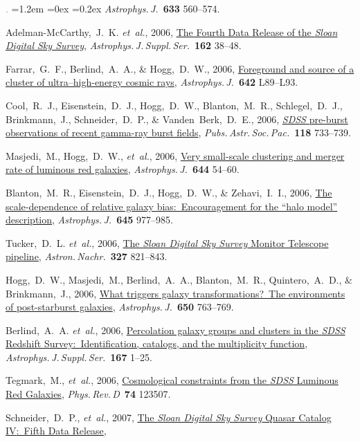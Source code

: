 \documentclass[10pt,letterpaper]{article}
\newcommand{\acronym}[1]{{\small{#1}}}
\newcommand{\foreign}[1]{\textsl{#1}}
\newcommand{\etal}{\foreign{et~al.}}
\newcommand{\project}[1]{\textsl{#1}}
\newcommand{\doi}[2]{\href{http://dx.doi.org/#1}{{#2}}}
\newcommand{\deemph}[1]{\textcolor{grey}{\footnotesize{#1}}}
\newcommand{\pubnumber}[1]{\deemph{{#1}.}}
\newcounter{refpubnum}
\newcommand{\hogglist}{%
    \rightmargin=0in
    \leftmargin=1.2em
    \topsep=0ex
    \partopsep=0pt
    \itemsep=0.2ex
    \parsep=0pt
    \itemindent=-1.0\leftmargin
    \listparindent=0.0\leftmargin
    \settowidth{\labelsep}{~}
    \usecounter{refpubnum}
  }
\begin{document}
\begin{list}{\pubnumber{\therefpubnum}}{\hogglist}
\textit{Astrophys.\,J.}\ \textbf{633} 560--574.
\item
Adelman-McCarthy,~J.~K. \etal, 2006,
\doi{10.1086/497917}{The Fourth Data Release of the \project{Sloan Digital Sky Survey}},
\textit{Astrophys.\,J.\,Suppl.\,Ser.}\ \textbf{162} 38--48.
\item
Farrar,~G.~F., Berlind,~A.~A., \& Hogg,~D.~W., 2006,
\doi{10.1086/504711}{Foreground and source of a cluster of ultra--high-energy cosmic rays},
\textit{Astrophys.\,J.}\ \textbf{642} L89--L93.
\item
Cool,~R.~J., Eisenstein,~D.~J., Hogg,~D.~W., Blanton,~M.~R., Schlegel,~D.~J., Brinkmann,~J., Schneider,~D.~P., \& Vanden~Berk,~D.~E., 2006,
\doi{10.1086/503334}{\project{\acronym{SDSS}} pre-burst observations of recent gamma-ray burst fields},
\textit{Pubs.\,Astr.\,Soc.\,Pac.}\ \textbf{118} 733--739.
\item\label{pub:Masjedi2006}
Masjedi,~M., Hogg,~D.~W., \etal, 2006,
\doi{10.1086/503536}{Very small-scale clustering and merger rate of luminous red galaxies},
\textit{Astrophys.\,J.}\ \textbf{644} 54--60.
\item
Blanton,~M.~R., Eisenstein,~D.~J., Hogg,~D.~W., \& Zehavi,~I.~I., 2006,
\doi{10.1086/500918}{The scale-dependence of relative galaxy bias:\ Encouragement for the ``halo model'' description},
\textit{Astrophys.\,J.}\ \textbf{645}
977--985.
\item
Tucker,~D.~L. \etal, 2006,
\doi{10.1002/asna.200610655}{The \project{Sloan Digital Sky Survey} Monitor Telescope pipeline},
\textit{Astron.\,Nachr.}\ \textbf{327} 821--843.
\item
Hogg,~D.~W., Masjedi,~M., Berlind,~A.~A., Blanton,~M.~R., Quintero,~A.~D., \& Brinkmann,~J., 2006,
\doi{10.1086/507172}{What triggers galaxy transformations?\ The environments of post-starburst galaxies},
\textit{Astrophys.\,J.}\ \textbf{650} 763--769.
\item
Berlind,~A.~A. \etal, 2006,
\doi{10.1086/508170}{Percolation galaxy groups and clusters in the \project{\acronym{SDSS}} Redshift Survey:\ Identification, catalogs, and the multiplicity function},
\textit{Astrophys.\,J.\,Suppl.\,Ser.}\ \textbf{167} 1--25.
\item
Tegmark,~M., \etal, 2006,
\doi{10.1103/PhysRevD.74.123507}{Cosmological constraints from the \project{\acronym{SDSS}} Luminous Red Galaxies},
\textit{Phys.\,Rev.\,D}\ \textbf{74} 123507.
\item
Schneider,~D.~P., \etal, 2007,
\doi{10.1086/518474}{The \project{Sloan Digital Sky Survey} Quasar Catalog \acronym{IV}:\ Fifth Data Release},

\end{list}
\end{document}
